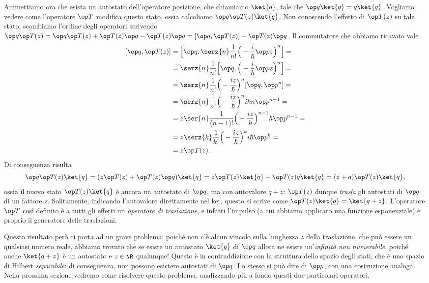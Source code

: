 Ammettiamo ora che esista un autostato dell'operatore posizione, che chiamiamo $\ket{q}$, tale che $\op q\ket{q}=q\ket{q}$.
Vogliamo vedere come l'operatore $\op T$ modifica questo stato, ossia calcoliamo $\op q\op T(z)\ket{q}$.
Non conoscendo l'effetto di $\op T(z)$ su tale stato, scambiamo l'ordine degli operatori scrivendo $\op q\op T(z)=\op q\op T(z)+\op T(z)\op q-\op T(z)\op q=[\op q,\op T(z)]+\op T(z)\op q$.
Il commutatore che abbiamo ricavato vale
\begin{equation}
	\begin{split}
		[\op q,\op T(z)]&=\Big[\op q,\serz{n}\frac1{n!}\Big(-\frac{i}{\hbar}\op pz\Big)^n\Big]=\\
		&=\serz{n}\frac1{n!}\Big[\op q,\Big(-\frac{i}{\hbar}\op pz\Big)^n\Big]=\\
		&=\serz{n}\frac1{n!}\Big(-\frac{iz}{\hbar}\Big)^n[\op q,\op p^n]=\\
		&=\serz{n}\frac1{n!}\Big(-\frac{iz}{\hbar}\Big)^ni\hbar n\op p^{n-1}=\\
		&=z\ser{n}\frac1{(n-1)!}\Big(-\frac{iz}{\hbar}\Big)^{n-1}\hbar\op p^{n-1}=\\
		&=z\serz{k}\frac1{k!}\Big(-\frac{iz}{\hbar}\Big)^ki\hbar \op p^k=\\
		&=z\op T(z).
	\end{split}
	\label{eq:commutatore-posizione-traslazione}
\end{equation}
Di conseguenza risulta
\begin{equation}
	\op q\op T(z)\ket{q}=(z\op T(z)+\op T(z)\op q)\ket{q}=z\op T(z)\ket{q}+\op T(z)q\ket{q}=(z+q)\op T(z)\ket{q},
\end{equation}
ossia il nuovo stato $\op T(z)\ket{q}$ è ancora un autostato di $\op q$, ma con autovalore $q+z$: $\op T(z)$ dunque \emph{trasla} gli autostati di $\op q$ di un fattore $z$.
Solitamente, indicando l'autovalore direttamente nel ket, questo si scrive come $\op T(z)\ket{q}=\ket{q+z}$.
L'operatore $\op T$ cos\`i definito è a tutti gli effetti un \emph{operatore di traslazione}, e infatti l'impulso (a cui abbiamo applicato una funzione esponenziale) è proprio il generatore delle traslazioni.

Questo risultato però ci porta ad un grave problema: poich\'e non c'è alcun vincolo sulla lunghezza $z$ della traslazione, che può essere un qualsiasi numero reale, abbiamo trovato che se esiste un autostato $\ket{q}$ di $\op q$ allora ne esiste un'\emph{infinità non numerabile}, poich\'e anche $\ket{q+z}$ è un autostato e $z\in\R$ qualunque!
Questo è in contraddizione con la struttura dello spazio degli stati, che è uno spazio di Hilbert \emph{separabile}: di conseguenza, non possono esistere autostati di $\op q$.
Lo stesso si può dire di $\op p$, con una costruzione analoga.
Nella prossima sezione vedremo come risolvere questo problema, analizzando più a fondo questi due particolari operatori.

